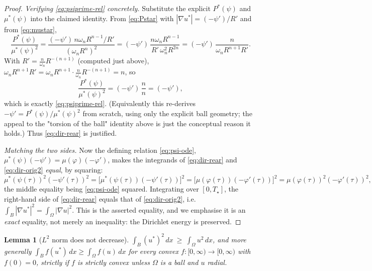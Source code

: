 \documentclass[11pt]{amsart}
\newtheorem{lemma}[theorem]{Lemma}
\theoremstyle{definition}
\newcommand{\Om}{\Omega}
\newcommand{\abs}[1]{\left|#1\right|}
\newcommand{\dx}{\,dx}
\begin{document}
\begin{proof}
\emph{Verifying \eqref{eq:psiprime-rel} concretely.} Substitute the explicit
$P^*(\psi)$ and $\mu^*(\psi)$ into the claimed identity. From \eqref{eq:Pstar}
with $\abs{\nabla u^*}=(-\psi')/R'$ and from \eqref{eq:mustar},
\[
  \frac{P^*(\psi)}{\mu^*(\psi)^2}
  =\frac{(-\psi')\,n\omega_n R^{n-1}/R'}{(\omega_n R^n)^2}
  =(-\psi')\,\frac{n\omega_n R^{n-1}}{R'\,\omega_n^2 R^{2n}}
  =(-\psi')\,\frac{n}{\omega_n R^{n+1}R'} .
\]
With $R'=\tfrac{n}{\omega_n}R^{-(n+1)}$ (computed just above),
$\omega_n R^{n+1}R'=\omega_n R^{n+1}\cdot\tfrac{n}{\omega_n}R^{-(n+1)}=n$, so
\[
  \frac{P^*(\psi)}{\mu^*(\psi)^2}=(-\psi')\,\frac{n}{n}=(-\psi'),
\]
which is exactly \eqref{eq:psiprime-rel}. (Equivalently this re-derives
$-\psi'=P^*(\psi)/\mu^*(\psi)^2$ from scratch, using only the explicit ball
geometry; the appeal to the "torsion of the ball" identity above is just the
conceptual reason it holds.) Thus \eqref{eq:dir-rear} is justified.

\emph{Matching the two sides.} Now the defining relation \eqref{eq:psi-ode},
$\mu^*(\psi)(-\psi')=\mu(\varphi)(-\varphi')$, makes the integrands of
\eqref{eq:dir-rear} and \eqref{eq:dir-orig2} \emph{equal}, by squaring:
\[
  \mu^*(\psi(\tau))^2(-\psi'(\tau))^2
  =\bigl[\mu^*(\psi(\tau))(-\psi'(\tau))\bigr]^2
  =\bigl[\mu(\varphi(\tau))(-\varphi'(\tau))\bigr]^2
  =\mu(\varphi(\tau))^2(-\varphi'(\tau))^2 ,
\]
the middle equality being \eqref{eq:psi-ode} squared. Integrating over
$[0,T_\star]$, the right-hand side of \eqref{eq:dir-rear} equals that of
\eqref{eq:dir-orig2}, i.e.\
$\int_B\abs{\nabla u^*}^2=\int_\Om\abs{\nabla u}^2$. This is the asserted
equality, and we emphasise it is an \emph{exact} equality, not merely an
inequality: the Dirichlet energy is preserved.
\end{proof}

\begin{lemma}[$L^2$ norm does not decrease]\label{lem:B}
$\displaystyle\int_B(u^*)^2\dx\ \ge\ \int_\Om u^2\dx$, and more generally
$\int_B f(u^*)\dx\ge\int_\Om f(u)\dx$ for every convex
$f:[0,\infty)\to[0,\infty)$ with $f(0)=0$, strictly if $f$ is strictly
convex unless $\Om$ is a ball and $u$ radial.
\end{lemma}
\end{document}
